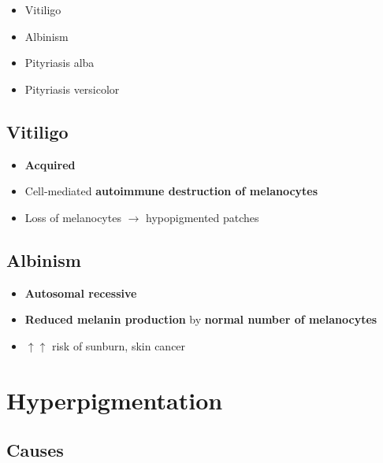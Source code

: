 \documentclass[
  12pt,
]{memoir}
\providecommand{\tightlist}{%
  \setlength{\itemsep}{0pt}\setlength{\parskip}{0pt}}
\begin{document}
\begin{itemize}
\tightlist
\item
  Vitiligo
\item
  Albinism
\item
  Pityriasis alba
\item
  Pityriasis versicolor
\end{itemize}

\hypertarget{vitiligo}{%
\subsection{Vitiligo}\label{vitiligo}}

\begin{itemize}
\tightlist
\item
  \textbf{Acquired}
\item
  Cell-mediated \textbf{autoimmune destruction of melanocytes}
\item
  Loss of melanocytes \(\rightarrow\) hypopigmented patches
\end{itemize}

\hypertarget{albinism}{%
\subsection{Albinism}\label{albinism}}

\begin{itemize}
\tightlist
\item
  \textbf{Autosomal recessive}
\item
  \textbf{Reduced melanin production} by \textbf{normal number of
  melanocytes}
\item
  \(\uparrow\uparrow\) risk of sunburn, skin cancer
\end{itemize}

\hypertarget{hyperpigmentation}{%
\section{Hyperpigmentation}\label{hyperpigmentation}}

\hypertarget{causes-2}{%
\subsection{Causes}\label{causes-2}}
\end{document}
